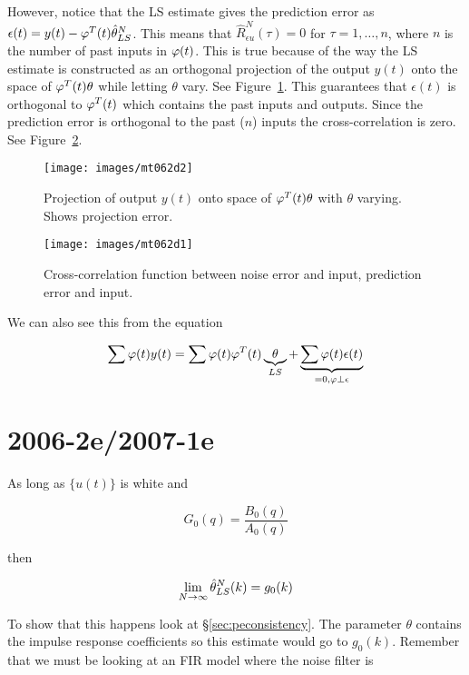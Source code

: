 However, notice that the LS estimate gives the prediction error as $\epsilon(t)=y(t)-\varphi^T(t)\hat{\theta}_{LS}^N$.
This means that $\hat{R}_{\epsilon u}^N(\tau)=0$ for $\tau=1,\ldots,n$, where $n$ is the number of past inputs in $\varphi(t)$.
This is true because of the way the LS estimate is constructed as an orthogonal projection of the output $y(t)$ onto the space of $\varphi^T(t)\theta$ while letting $\theta$ vary.
See Figure~\ref{fig:mt062d2}.
This guarantees that $\epsilon(t)$ is orthogonal to $\varphi^T(t)$ which contains the past inputs and outputs.
Since the prediction error is orthogonal to the past ($n$) inputs the cross-correlation is zero.
See Figure~\ref{fig:mt062d1}.

\begin{figure}[ht!]
\centering
\texttt{[image: images/mt062d2]}
\caption{Projection of output $y(t)$ onto space of $\varphi^T(t)\theta$ with $\theta$ varying. Shows projection error.}%
\label{fig:mt062d2}
\end{figure}

\begin{figure}[ht!]
\centering
\texttt{[image: images/mt062d1]}
\caption{Cross-correlation function between noise error and input, prediction error and input.}%
\label{fig:mt062d1}
\end{figure}

We can also see this from the equation

\begin{equation*}
\sum\varphi(t)y(t) = \sum\varphi(t)\varphi^T(t)\underbrace{\theta}_{LS} + \underbrace{\sum\varphi(t)\epsilon(t)}_{=0, \varphi\perp\epsilon}
\end{equation*}

\section{2006-2e/2007-1e}%
As long as $\{u(t)\}$ is white and

\begin{equation*}
G_0(q)=\frac{B_0(q)}{A_0(q)}
\end{equation*}

then

\begin{equation*}
\lim_{N\to\infty}\hat{\theta}_{LS}^N(k)=g_0(k)
\end{equation*}

To show that this happens look at \S\ref{sec:peconsistency}.
The parameter $\theta$ contains the impulse response coefficients so this estimate would go to $g_0(k)$.
Remember that we must be looking at an FIR model where the noise filter is

